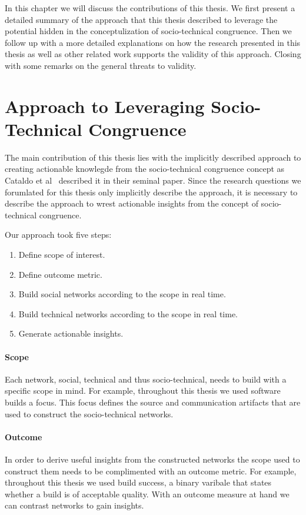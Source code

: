 In this chapter we will discuss the contributions of this thesis.
We first present a detailed summary of the approach that this thesis described to leverage the potential hidden in the conceptulization of socio-technical congruence.
Then we follow up with a more detailed explanations on how the research presented in this thesis as well as other related work supports the validity of this approach.
Closing with some remarks on the general threats to validity.

\section{Approach to Leveraging Socio-Technical Congruence}
The main contribution of this thesis lies with the implicitly described approach to creating actionable knowlegde from the socio-technical congruence concept as Cataldo et al~\cite{} described it in their seminal paper.
Since the research questions we forumlated for this thesis only implicitly describe the approach, it is necessary to describe the approach to wrest actionable insights from the concept of socio-technical congruence.

Our approach took five steps:
\begin{enumerate}
\item Define scope of interest.
\item Define outcome metric.
\item Build social networks according to the scope in real time.
\item Build technical networks according to the scope in real time.
\item Generate actionable insights.
\end{enumerate}

\paragraph{Scope} 
Each network, social, technical and thus socio-technical, needs to build with a specific scope in mind.
For example, throughout this thesis we used software builds a focus.
This focus defines the source and communication artifacts that are used to construct the socio-technical networks. 

\paragraph{Outcome}
In order to derive useful insights from the constructed networks the scope used to construct them needs to be complimented with an outcome metric.
For example, throughout this thesis we used build success, a binary varibale that states whether a build is of acceptable quality.
With an outcome measure at hand we can contrast networks to gain insights.

